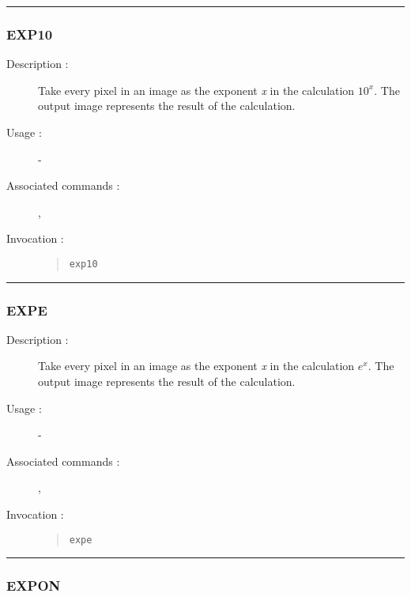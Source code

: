 \hrule
\subsubsection*{\label{EXP10}EXP10}

\begin{description}

\item[Description :] Take every pixel in an image as the exponent {\it x} in
the calculation $10^{x}$.  The output image represents the result of the
calculation.

\item[Usage :] -

\item[Associated commands :] {\tt {}},
{\tt {}}

\item[Invocation :]

\begin{quote}{\tt  exp10 }\end{quote}

\end{description}

\hrule
\subsubsection*{\label{EXPE}EXPE}

\begin{description}

\item[Description :] Take every pixel in an image as the exponent {\it x} in
the calculation $e^{x}$.  The output image represents the result of the
calculation.

\item[Usage :] -

\item[Associated commands :] {\tt {}},
{\tt {}}

\item[Invocation :]

\begin{quote}{\tt  expe }\end{quote}

\end{description}

\hrule
\subsubsection*{\label{EXPON}EXPON}

